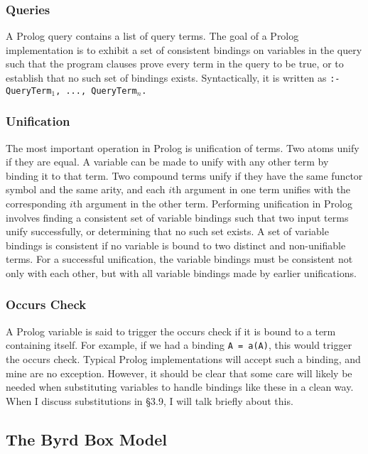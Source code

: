 \documentclass[12pt]{article}
\begin{document}
\subsubsection{Queries}

A Prolog query contains a list of query terms. 
The goal of a Prolog implementation is to exhibit a set of consistent bindings on variables in the query such that the program clauses prove every term in the query to be true, or to establish that no such set of bindings exists. 
Syntactically, it is written as \verb|:- QueryTerm|$_1$\verb|, ..., QueryTerm|$_n$\verb|.|

\subsubsection{Unification}

The most important operation in Prolog is unification of terms. 
Two atoms unify if they are equal. 
A variable can be made to unify with any other term by binding it to that term. 
Two compound terms unify if they have the same functor symbol and the same arity, and each $i$th argument in one term unifies with the corresponding $i$th argument in the other term. 
Performing unification in Prolog involves finding a consistent set of variable bindings such that two input terms unify successfully, or determining that no such set exists. 
A set of variable bindings is consistent if no variable is bound to two distinct and non-unifiable terms. 
For a successful unification, the variable bindings must be consistent not only with each other, but with all variable bindings made by earlier unifications.

\subsubsection{Occurs Check}

A Prolog variable is said to trigger the occurs check if it is bound to a term containing itself.
For example, if we had a binding \verb|A = a(A)|, this would trigger the occurs check.
Typical Prolog implementations will accept such a binding, and mine are no exception.
However, it should be clear that some care will likely be needed when substituting variables to handle bindings like these in a clean way.
When I discuss substitutions in \S3.9, I will talk briefly about this.

\subsection{The Byrd Box Model}
\end{document}
